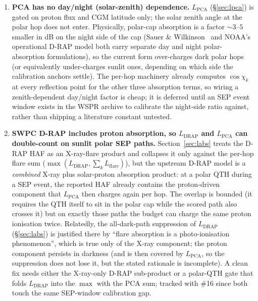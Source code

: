 \documentclass[11pt,a4paper]{article}
\begin{document}
\begin{enumerate}[leftmargin=*]
  \item \textbf{PCA has no day/night (solar-zenith) dependence.}
        $L_{\text{PCA}}$ (\S\ref{sec:lpca}) is gated on proton
        flux and CGM latitude only; the solar zenith angle at the
        polar hop does not enter.  Physically, polar-cap
        absorption is a factor ${\sim}3$--$5$ smaller in dB on
        the night side of the cap (Sauer \&
        Wilkinson~\cite{sauer2008} and NOAA's operational D-RAP
        model both carry separate day and night polar-absorption
        formulations), so the current form over-charges dark
        polar hops (or equivalently under-charges sunlit ones,
        depending on which side the calibration anchors settle).
        The per-hop machinery already computes $\cos\chi_k$ at
        every reflection point for the other three absorption
        terms, so wiring a zenith-dependent day/night factor is
        cheap; it is deferred until an SEP event window exists in
        the WSPR archive to calibrate the night-side ratio
        against, rather than shipping a literature constant
        untested.

  \item \textbf{SWPC D-RAP includes proton absorption, so
        $L_{\text{DRAP}}$ and $L_{\text{PCA}}$ can double-count
        on sunlit polar SEP paths.}  Section~\ref{sec:labs}
        treats the D-RAP HAF as an X-ray-flare product and
        collapses it only against the per-hop flare sum
        ($\max(L_{\text{DRAP}}, \sum_k L_{\text{flare}})$), but
        the upstream D-RAP model is a \emph{combined} X-ray plus
        solar-proton absorption product: at a polar QTH during a
        SEP event, the reported HAF already contains the
        proton-driven component that $L_{\text{PCA}}$ then
        charges again per hop.  The overlap is bounded (it
        requires the QTH itself to sit in the polar cap while
        the scored path also crosses it) but on exactly those
        paths the budget can charge the same proton ionisation
        twice.  Relatedly, the all-dark-path suppression of
        $L_{\text{DRAP}}$ (\S\ref{sec:labs}) is justified there
        by ``flare absorption is a photo-ionisation phenomenon'',
        which is true only of the X-ray component; the proton
        component persists in darkness (and is then covered by
        $L_{\text{PCA}}$, so the suppression does not lose it,
        but the stated rationale is incomplete).  A clean fix
        needs either the X-ray-only D-RAP sub-product or a
        polar-QTH gate that folds $L_{\text{DRAP}}$ into the
        $\max$ with the PCA sum; tracked with \#16 since both
        touch the same SEP-window calibration gap.
\end{enumerate}
\end{document}
